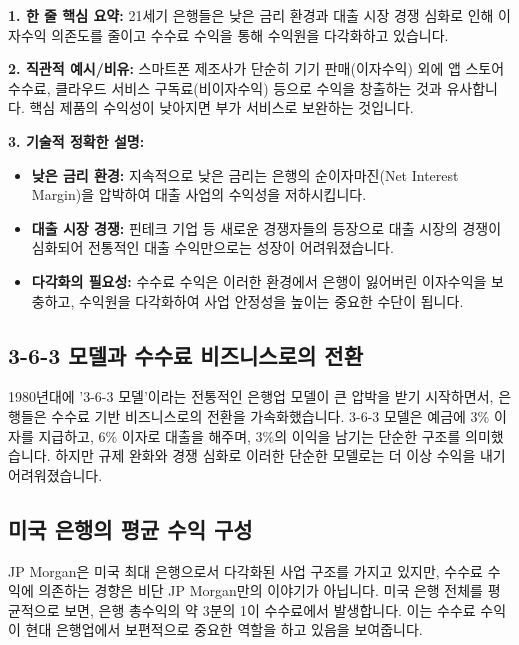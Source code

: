 \documentclass[11pt,a4paper]{article}
\begin{document}
\begin{tcolorbox}[mybox,title={수수료 수익 증가의 배경}]
\textbf{1. 한 줄 핵심 요약:} 21세기 은행들은 낮은 금리 환경과 대출 시장 경쟁 심화로 인해 이자수익 의존도를 줄이고 수수료 수익을 통해 수익원을 다각화하고 있습니다.

\textbf{2. 직관적 예시/비유:} 스마트폰 제조사가 단순히 기기 판매(이자수익) 외에 앱 스토어 수수료, 클라우드 서비스 구독료(비이자수익) 등으로 수익을 창출하는 것과 유사합니다. 핵심 제품의 수익성이 낮아지면 부가 서비스로 보완하는 것입니다.

\textbf{3. 기술적 정확한 설명:}
\begin{itemize}
    \item \textbf{낮은 금리 환경:} 지속적으로 낮은 금리는 은행의 순이자마진(Net Interest Margin)을 압박하여 대출 사업의 수익성을 저하시킵니다.
    \item \textbf{대출 시장 경쟁:} 핀테크 기업 등 새로운 경쟁자들의 등장으로 대출 시장의 경쟁이 심화되어 전통적인 대출 수익만으로는 성장이 어려워졌습니다.
    \item \textbf{다각화의 필요성:} 수수료 수익은 이러한 환경에서 은행이 잃어버린 이자수익을 보충하고, 수익원을 다각화하여 사업 안정성을 높이는 중요한 수단이 됩니다.
\end{itemize}
\end{tcolorbox}

\subsection*{3-6-3 모델과 수수료 비즈니스로의 전환}

1980년대에 '3-6-3 모델'이라는 전통적인 은행업 모델이 큰 압박을 받기 시작하면서, 은행들은 수수료 기반 비즈니스로의 전환을 가속화했습니다. 3-6-3 모델은 예금에 3\% 이자를 지급하고, 6\% 이자로 대출을 해주며, 3\%의 이익을 남기는 단순한 구조를 의미했습니다. 하지만 규제 완화와 경쟁 심화로 이러한 단순한 모델로는 더 이상 수익을 내기 어려워졌습니다.

\subsection*{미국 은행의 평균 수익 구성}

JP Morgan은 미국 최대 은행으로서 다각화된 사업 구조를 가지고 있지만, 수수료 수익에 의존하는 경향은 비단 JP Morgan만의 이야기가 아닙니다. 미국 은행 전체를 평균적으로 보면, 은행 총수익의 약 3분의 1이 수수료에서 발생합니다. 이는 수수료 수익이 현대 은행업에서 보편적으로 중요한 역할을 하고 있음을 보여줍니다.
\end{document}
